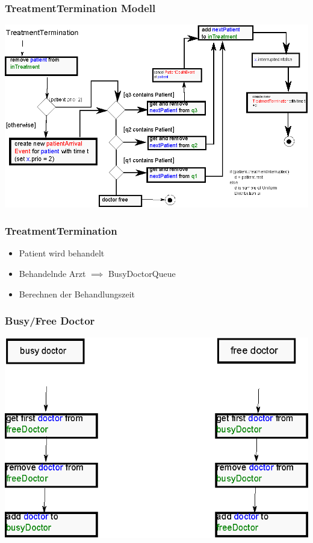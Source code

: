 \documentclass{beamer}
\begin{document}
\begin{frame}
	\frametitle{TreatmentTermination Modell}
	\begin{center}
		\includegraphics[scale=0.9]{img/TreatmentTermination.eps}
	\end{center}
\end{frame}

\begin{frame}
	\frametitle{TreatmentTermination}
	\begin{itemize}
		\item Patient wird behandelt
		\item Behandelnde Arzt $\implies$ BusyDoctorQueue
		\item Berechnen der Behandlungszeit
	\end{itemize}
\end{frame}

\begin{frame}
	\frametitle{Busy/Free Doctor}
	\begin{center}
		\includegraphics[scale=1]{img/freeDoctor.eps}
	\end{center}
	
\end{frame}
\end{document}
